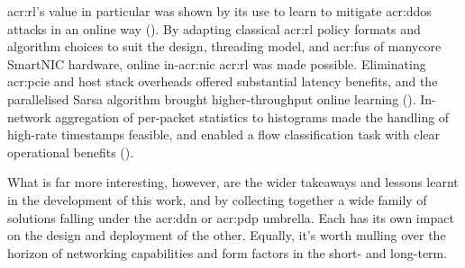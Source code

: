 \gls{acr:rl}'s value in particular was shown by its use to learn to mitigate \gls{acr:ddos} attacks in an online way ().
By adapting classical \gls{acr:rl} policy formats and algorithm choices to suit the design, threading model, and \glspl{acr:fu} of manycore SmartNIC hardware, online in-\gls{acr:nic} \gls{acr:rl} was made possible.
Eliminating \gls{acr:pcie} and host stack overheads offered substantial latency benefits, and the parallelised Sarsa algorithm brought higher-throughput online learning ().
In-network aggregation of per-packet statistics to histograms made the handling of high-rate timestamps feasible, and enabled a flow classification task with clear operational benefits ().

What is far more interesting, however, are the wider takeaways and lessons learnt in the development of this work, and by collecting together a wide family of solutions falling under the \gls{acr:ddn} or \gls{acr:pdp} umbrella.
Each has its own impact on the design and deployment of the other.
Equally, it's worth mulling over the horizon of networking capabilities and form factors in the short- and long-term.

